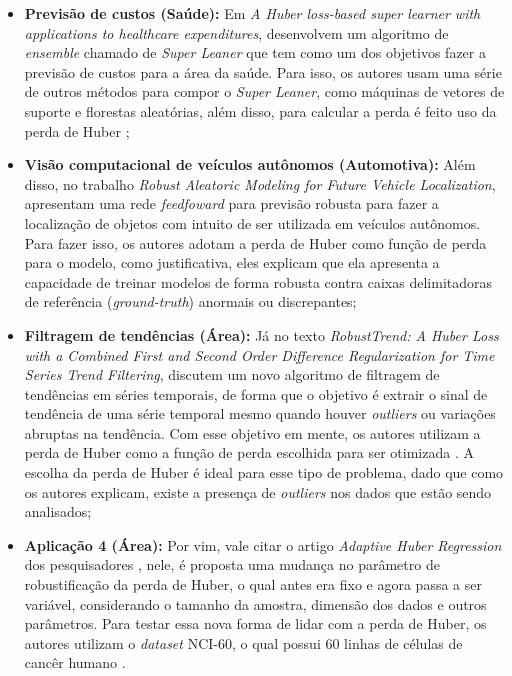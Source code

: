 \begin{itemize}
    \item \textbf{Previsão de custos (Saúde):} Em \textit{A Huber loss-based super learner with applications to healthcare expenditures}, \textcite{HuberLossSuperLearner} desenvolvem um algoritmo de \textit{ensemble} chamado de \textit{Super Leaner} que tem como um dos objetivos fazer a previsão de custos para a área da saúde. Para isso, os autores usam uma série de outros métodos para compor o \textit{Super Leaner}, como máquinas de vetores de suporte e florestas aleatórias, além disso, para calcular a perda é feito uso da perda de Huber \parencite{HuberLossSuperLearner};
    \item \textbf{Visão computacional de veículos autônomos (Automotiva):} Além disso, no trabalho \textit{Robust Aleatoric Modeling for Future Vehicle Localization},\textcite{RobustAleatoricModelingVehicleLocalization} apresentam uma rede \textit{feedfoward} para previsão robusta para fazer a localização de objetos com intuito de ser utilizada em veículos autônomos. Para fazer isso, os autores adotam a perda de Huber como função de perda para o modelo, como justificativa, eles explicam que ela apresenta a capacidade de treinar modelos de forma robusta contra caixas delimitadoras de referência (\textit{ground-truth}) anormais ou discrepantes;
    \item \textbf{Filtragem de tendências (Área):} Já no texto \textit{RobustTrend: A Huber Loss with a Combined First and Second Order Difference Regularization for Time Series Trend Filtering}, \textcite{RobustTrendHuberLoss} discutem um novo algoritmo de filtragem de tendências em séries temporais, de forma que o objetivo é extrair o sinal de tendência de uma série temporal mesmo quando houver \textit{outliers} ou variações abruptas na tendência. Com esse objetivo em mente, os autores utilizam a perda de Huber como a função de perda escolhida para ser otimizada \parencite{RobustTrendHuberLoss}. A escolha da perda de Huber é ideal para esse tipo de problema, dado que como os autores explicam, existe a presença de \textit{outliers} nos dados que estão sendo analisados;
    \item \textbf{Aplicação 4 (Área):} Por vim, vale citar o artigo \textit{Adaptive Huber Regression} dos pesquisadores \textcite{AdaptiveHuberRegression}, nele, é proposta uma mudança no parâmetro de robustificação da perda de Huber, o qual antes era fixo e agora passa a ser variável, considerando o tamanho da amostra, dimensão dos dados e outros parâmetros. Para testar essa nova forma de lidar com a perda de Huber, os autores utilizam o \textit{dataset} NCI-60, o qual possui 60 linhas de células de cancêr humano \parencite{AdaptiveHuberRegression}.
\end{itemize}


